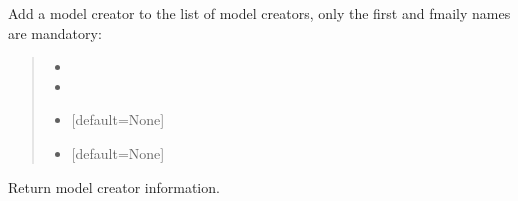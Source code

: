 \documentclass[letterpaper,12pt,english]{sphinxmanual}
\begin{document}
\begin{fulllineitems}
\begin{fulllineitems}
\begin{quote}
\begin{description}
\end{description}\end{quote}

\end{fulllineitems}


\begin{fulllineitems}
\label{\detokenize{api/core:cbmpy.CBModel.Model.addModelCreator}}
\pysigstartsignatures
\pysiglinewithargsret
{}
{\sphinxparamcomma {}\sphinxparamcomma {}\sphinxparamcomma {}}
{}
\pysigstopsignatures
\sphinxAtStartPar
Add a model creator to the list of model creators, only the first and fmaily names are mandatory:
\begin{quote}\begin{description}
\begin{itemize}
\item {} 
\sphinxAtStartPar
{}

\item {} 
\sphinxAtStartPar
{}

\item {} 
\sphinxAtStartPar
{} \textendash{} {[}default=None{]}

\item {} 
\sphinxAtStartPar
{} \textendash{} {[}default=None{]}

\end{itemize}

\end{description}\end{quote}

\end{fulllineitems}


\begin{fulllineitems}
\label{\detokenize{api/core:cbmpy.CBModel.Model.getModelCreators}}
\pysigstartsignatures
\pysiglinewithargsret
{}
{}
{}
\pysigstopsignatures
\sphinxAtStartPar
Return model creator information.


\end{fulllineitems}
\end{fulllineitems}
\end{document}
